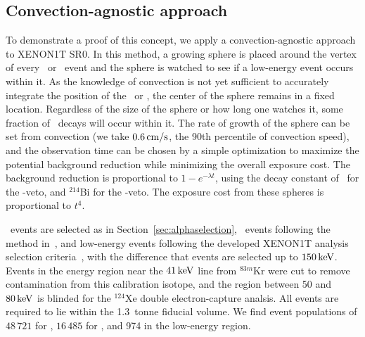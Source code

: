 \subsection{Convection-agnostic approach}

To demonstrate a proof of this concept, we apply a convection-agnostic approach to XENON1T SR0. In this method, a growing sphere is placed around the vertex of every \Po~or \BiPo~event and the sphere is watched to see if a low-energy event occurs within it. As the knowledge of convection is not yet sufficient to accurately integrate the position of the \Po~or \BiPo, the center of the sphere remains in a fixed location. Regardless of the size of the sphere or how long one watches it, some fraction of \Pb~decays will occur within it. The rate of growth of the sphere can be set from convection (we take $0.6\,\mathrm{cm/s}$, the 90th percentile of convection speed), and the observation time can be chosen by a simple optimization to maximize the potential background reduction while minimizing the overall exposure cost. The background reduction is proportional to $1-e^{-\lambda t}$, using the decay constant of \Pb~for the \Po-veto, and $^{214}$Bi for the \BiPo-veto. The exposure cost from these spheres is proportional to $t^4$.

\Po~events are selected as in Section~\ref{sec:alphaselection}, \BiPo~events following the method in~\cite{Aprile:2017fhu}, and low-energy events following the developed XENON1T analysis selection criteria~\cite{Aprile:2017iyp}, with the difference that events are selected up to $150\,\mathrm{keV}$. Events in the energy region near the $41\,\mathrm{keV}$ line from $^{83m}$Kr were cut to remove contamination from this calibration isotope, and the region between 50 and $80\,\mathrm{keV}$ is blinded for the $^{124}$Xe double electron-capture analsis. All events are required to lie within the 1.3~tonne fiducial volume. We find event populations of $48\,721$ for \Po, $16\,485$ for \BiPo, and 974 in the low-energy region.


